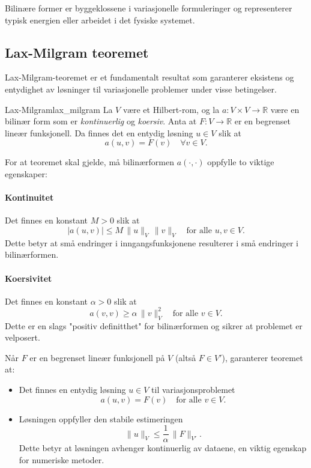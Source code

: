 Bilinære former er byggeklossene i variasjonelle formuleringer og representerer typisk energien eller arbeidet i det fysiske systemet.

\subsection{Lax-Milgram teoremet}\label{sec:lax_milgram}
Lax-Milgram-teoremet er et fundamentalt resultat som garanterer eksistens og entydighet av løsninger til variasjonelle problemer under visse betingelser.

\begin{theorem}{Lax-Milgram}{lax_milgram}
	La $V$ være et Hilbert-rom, og la $a: V \times V \to \mathbb{R}$ være en bilinær form som er \emph{kontinuerlig} og \emph{koersiv}. Anta at $F: V \to \mathbb{R}$ er en begrenset lineær funksjonell. Da finnes det en entydig løsning $u \in V$ slik at
	\[
		a(u,v) = F(v) \quad \forall v \in V.
	\]
\end{theorem}

For at teoremet skal gjelde, må bilinærformen $a(\cdot, \cdot)$ oppfylle to viktige egenskaper:

\paragraph{Kontinuitet} Det finnes en konstant $M > 0$ slik at
\[
	|a(u,v)| \leq M\, \|u\|_V\, \|v\|_V \quad \text{for alle } u,v\in V.
\]
Dette betyr at små endringer i inngangsfunksjonene resulterer i små endringer i bilinærformen.

\paragraph{Koersivitet} Det finnes en konstant $\alpha > 0$ slik at
\[
	a(v,v) \geq \alpha\, \|v\|_V^2 \quad \text{for alle } v\in V.
\]
Dette er en slags "positiv definitthet" for bilinærformen og sikrer at problemet er velposert.

Når $F$ er en begrenset lineær funksjonell på $V$ (altså $F \in V'$), garanterer teoremet at:
\begin{itemize}
	\item Det finnes en entydig løsning $u \in V$ til variasjonsproblemet
	      \[
		      a(u,v)=F(v) \quad \text{for alle } v\in V.
	      \]

	\item Løsningen oppfyller den stabile estimeringen
	      \[
		      \|u\|_V \leq \frac{1}{\alpha}\, \|F\|_{V'}.
	      \]
	      Dette betyr at løsningen avhenger kontinuerlig av dataene, en viktig egenskap for numeriske metoder.
\end{itemize}

